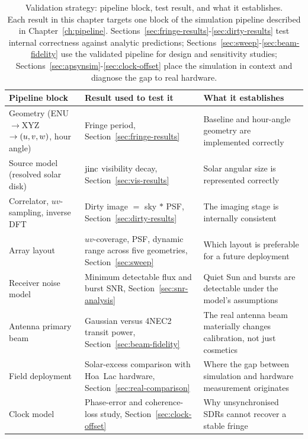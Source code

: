 \begin{table}[H]
  \centering
  \caption[Validation strategy: pipeline block, test result, and what it establishes]{Validation strategy: pipeline block, test result, and what it establishes.\\[4pt]
  Each result in this chapter targets one block of the simulation pipeline
  described in Chapter~\ref{ch:pipeline}. Sections~\ref{sec:fringe-results}-\ref{sec:dirty-results}
  test internal correctness against analytic predictions; Sections~\ref{sec:sweep}-\ref{sec:beam-fidelity}
  use the validated pipeline for design and sensitivity studies; Sections~\ref{sec:apsynsim}-\ref{sec:clock-offset}
  place the simulation in context and diagnose the gap to real hardware.}
  \label{tab:result-strategy}
  \renewcommand{\arraystretch}{1.3}
  \begin{tabularx}{\textwidth}{l X X}
    \toprule
    \textbf{Pipeline block} & \textbf{Result used to test it} & \textbf{What it establishes} \\
    \midrule
    Geometry (ENU$\rightarrow$XYZ$\rightarrow(u,v,w)$, hour angle)
      & Fringe period, Section~\ref{sec:fringe-results}
      & Baseline and hour-angle geometry are implemented correctly \\
    Source model (resolved solar disk)
      & $\operatorname{jinc}$ visibility decay, Section~\ref{sec:vis-results}
      & Solar angular size is represented correctly \\
    Correlator, $uv$-sampling, inverse DFT
      & Dirty image $=$ sky $*$ PSF, Section~\ref{sec:dirty-results}
      & The imaging stage is internally consistent \\
    Array layout
      & $uv$-coverage, PSF, dynamic range across five geometries, Section~\ref{sec:sweep}
      & Which layout is preferable for a future deployment \\
    Receiver noise model
      & Minimum detectable flux and burst SNR, Section~\ref{sec:snr-analysis}
      & Quiet Sun and bursts are detectable under the model's assumptions \\
    Antenna primary beam
      & Gaussian versus 4NEC2 transit power, Section~\ref{sec:beam-fidelity}
      & The real antenna beam materially changes calibration, not just cosmetics \\
    Field deployment
      & Solar-excess comparison with Hoa~Lac hardware, Section~\ref{sec:real-comparison}
      & Where the gap between simulation and hardware measurement originates \\
    Clock model
      & Phase-error and coherence-loss study, Section~\ref{sec:clock-offset}
      & Why unsynchronised SDRs cannot recover a stable fringe \\
    \bottomrule
  \end{tabularx}
\end{table}

